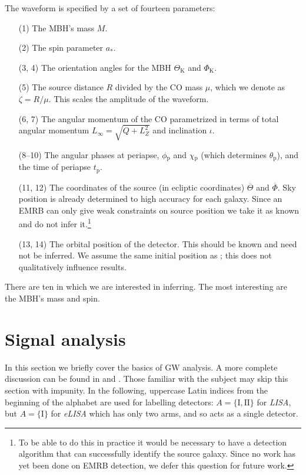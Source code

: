 \documentclass[useAMS,usedcolumn,usegraphicx,usenatbib]{mn2e}
\newcommand{\sub}[1]{\ensuremath{_\mathrm{#1}}}
\begin{document}
The waveform is specified by a set of fourteen parameters:
\begin{enumerate}
\item[(1)] The MBH's mass $M$.
\item[(2)] The spin parameter $a_\ast$.
\item[(3, 4)] The orientation angles for the MBH $\Theta\sub{K}$ and $\Phi\sub{K}$.
\item[(5)] The source distance $R$ divided by the CO mass $\mu$, which we denote as $\zeta = R/\mu$. This scales the amplitude of the waveform.
\item[(6, 7)] The angular momentum of the CO parametrized in terms of total angular momentum $L_\infty = \sqrt{Q + L_Z^2}$ and inclination $\iota$.
\item[(8--10)] The angular phases at periapse, $\phi\sub{p}$ and $\chi\sub{p}$ (which determines $\theta\sub{p}$), and the time of periapse $t\sub{p}$.
\item[(11, 12)] The coordinates of the source (in ecliptic coordinates) $\overline{\Theta}$ and $\overline{\Phi}$. Sky position is already determined to high accuracy for each galaxy. Since an EMRB can only give weak constraints on source position we take it as known and do not infer it.\footnote{To be able to do this in practice it would be necessary to have a detection algorithm that can successfully identify the source galaxy. Since no work has yet been done on EMRB detection, we defer this question for future work.}
\item[(13, 14)] The orbital position of the detector. This should be known and need not be inferred. We assume the same initial position as \citet{Cutler1998}; this does not qualitatively influence results.
\end{enumerate}
There are ten in which we are interested in inferring. The most interesting are the MBH's mass and spin.

\section{Signal analysis}\label{sec:Sig}

In this section we briefly cover the basics of GW analysis. A more complete discussion can be found in \citet{Finn1992} and \citet{Cutler1994}. Those familiar with the subject may skip this section with impunity. In the following, uppercase Latin indices from the beginning of the alphabet are used for labelling detectors: $A = \{\mathrm{I}, \mathrm{II}\}$ for \textit{LISA}, but $A = \{\mathrm{I}\}$ for \textit{eLISA} which has only two arms, and so acts as a single detector.
\end{document}
